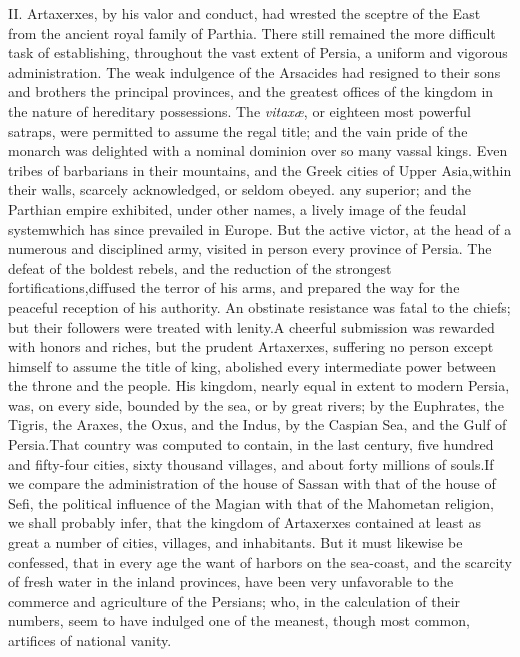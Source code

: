 II. Artaxerxes, by his valor and conduct, had wrested the sceptre
of the East from the ancient royal family of Parthia. There still
remained the more difficult task of establishing, throughout the
vast extent of Persia, a uniform and vigorous administration. The
weak indulgence of the Arsacides had resigned to their sons and
brothers the principal provinces, and the greatest offices of the
kingdom in the nature of hereditary possessions. The \textit{vitaxæ}, or
eighteen most powerful satraps, were permitted to assume the
regal title; and the vain pride of the monarch was delighted with
a nominal dominion over so many vassal kings. Even tribes of
barbarians in their mountains, and the Greek cities of Upper
Asia,\footnotemark[31] within their walls, scarcely acknowledged, or seldom
obeyed. any superior; and the Parthian empire exhibited, under
other names, a lively image of the feudal system\footnotemark[32] which has
since prevailed in Europe. But the active victor, at the head of
a numerous and disciplined army, visited in person every province
of Persia. The defeat of the boldest rebels, and the reduction of
the strongest fortifications,\footnotemark[33] diffused the terror of his arms,
and prepared the way for the peaceful reception of his authority.
An obstinate resistance was fatal to the chiefs; but their
followers were treated with lenity.\footnotemark[34] A cheerful submission was
rewarded with honors and riches, but the prudent Artaxerxes,
suffering no person except himself to assume the title of king,
abolished every intermediate power between the throne and the
people. His kingdom, nearly equal in extent to modern Persia,
was, on every side, bounded by the sea, or by great rivers; by
the Euphrates, the Tigris, the Araxes, the Oxus, and the Indus,
by the Caspian Sea, and the Gulf of Persia.\footnotemark[35] That country was
computed to contain, in the last century, five hundred and
fifty-four cities, sixty thousand villages, and about forty
millions of souls.\footnotemark[36] If we compare the administration of the
house of Sassan with that of the house of Sefi, the political
influence of the Magian with that of the Mahometan religion, we
shall probably infer, that the kingdom of Artaxerxes contained at
least as great a number of cities, villages, and inhabitants. But
it must likewise be confessed, that in every age the want of
harbors on the sea-coast, and the scarcity of fresh water in the
inland provinces, have been very unfavorable to the commerce and
agriculture of the Persians; who, in the calculation of their
numbers, seem to have indulged one of the meanest, though most
common, artifices of national vanity.

